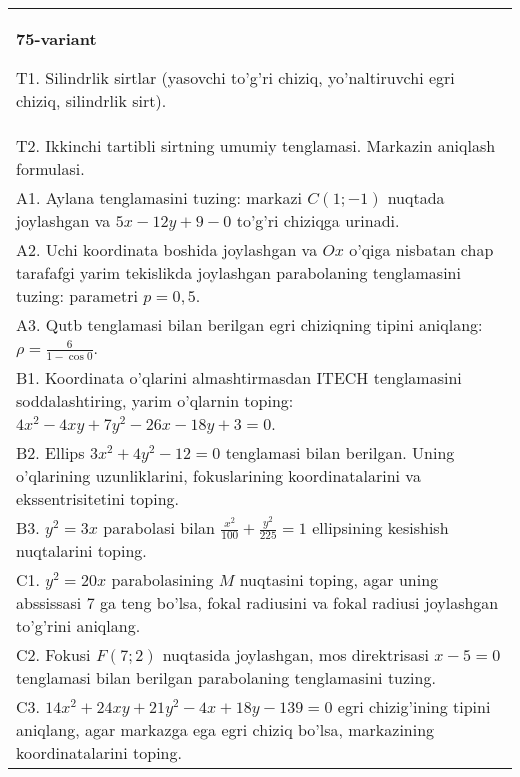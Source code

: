 \documentclass{article}
\begin{document}
\begin{tabular}{m{17cm}}
\textbf{75-variant}
\newline

T1. Silindrlik sirtlar (yasovchi to'g'ri chiziq, yo'naltiruvchi egri chiziq, silindrlik sirt).\\

T2. Ikkinchi tartibli sirtning umumiy tenglamasi. Markazin aniqlash formulasi.\\

A1. Aylana tenglamasini tuzing: markazi $C(1;-1)$ nuqtada joylashgan va $5x-12y+9-0$ to'g'ri chiziqga urinadi.\\

A2. Uchi koordinata boshida joylashgan va $Ox$ o'qiga nisbatan chap tarafafgi yarim tekislikda joylashgan parabolaning tenglamasini tuzing: parametri $p=0,5$.\\

A3. Qutb tenglamasi bilan berilgan egri chiziqning tipini aniqlang: $\rho=\frac{6}{1-\cos 0}$.\\

B1. Koordinata o'qlarini almashtirmasdan ITECH tenglamasini soddalashtiring, yarim o'qlarnin toping: $4x^{2} - 4xy + 7y^{2} - 26x - 18y + 3 = 0$.\\

B2. Ellips $3x^{2} + 4y^{2} - 12 = 0$ tenglamasi bilan berilgan. Uning o'qlarining uzunliklarini, fokuslarining koordinatalarini va ekssentrisitetini toping.  \\

B3. $y^{2} = 3x$ parabolasi bilan $\frac{x^{2}}{100} + \frac{y^{2}}{225} = 1$ ellipsining kesishish nuqtalarini toping.  \\

C1. $y^{2} = 20x$ parabolasining $M$ nuqtasini toping, agar uning abssissasi 7 ga teng bo'lsa, fokal radiusini va fokal radiusi joylashgan to'g'rini aniqlang.\\

C2. Fokusi $F(7;2)$ nuqtasida joylashgan, mos direktrisasi $x - 5 = 0$ tenglamasi bilan berilgan parabolaning tenglamasini tuzing.  \\

C3. $14x^{2} + 24xy + 21y^{2} - 4x + 18y - 139 = 0$ egri chizig'ining tipini aniqlang, agar markazga ega egri chiziq bo'lsa, markazining koordinatalarini toping.  \\

\end{tabular}
\vspace{1cm}
\end{document}
